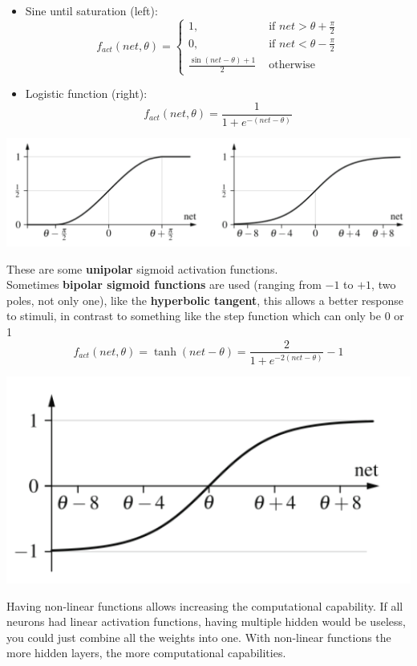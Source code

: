 \documentclass[11pt]{article}
\begin{document}
		\newpage
		
		\begin{itemize}
			\item Sine until saturation (left):
			$$ f_{act} (net, \theta) = \begin{cases}
				1, \;\; & \text{ if } net > \theta + \frac{\pi}{2} \\
				0, & \text{ if } net < \theta - \frac{\pi}{2} \\
				\frac{\sin(net - \theta) + 1}{2} & \text{ otherwise } 
			\end{cases} $$
			\item Logistic function (right):
			$$ f_{act} (net, \theta) = \frac{1}{1 + e^{-(net - \theta)}} $$
		\end{itemize}
		\begin{center}
			\includegraphics[width=0.9\columnwidth]{img/NN/sigmoid2}
		\end{center}
		These are some \textbf{unipolar} sigmoid activation functions.\\
		
		Sometimes \textbf{bipolar sigmoid functions} are used (ranging from $-1$ to $+1$, two poles, not only one), like the \textbf{hyperbolic tangent}, this allows a better response to stimuli, in contrast to something like the step function which can only be 0 or 1
		$$ f_{act} (net, \theta) = \tanh (net - \theta) = \frac{2}{1 + e^{-2(net-\theta)}} - 1 $$
		\begin{center}
			\includegraphics[width=0.48\columnwidth]{img/NN/sigmoid3}
		\end{center}
		
		Having non-linear functions allows increasing the computational capability. If all neurons had linear activation functions, having multiple hidden would be useless, you could just combine all the weights into one. With non-linear functions the more hidden layers, the more computational capabilities.\\
		
\end{document}
